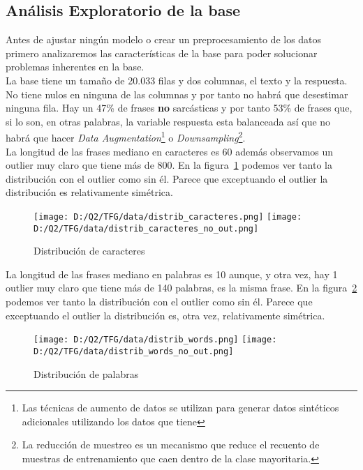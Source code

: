 \documentclass[10pt,riqno,a4paper,twoside]{article}\usepackage[]{graphicx}\usepackage[]{color}
\begin{document}
\subsection{Análisis Exploratorio de la base}

Antes de ajustar ningún modelo o crear un preprocesamiento de los datos primero analizaremos las características de la base para poder solucionar problemas inherentes en la base. \\

La base tiene un tamaño de 20.033 filas y dos columnas, el texto y la respuesta. No tiene nulos en ninguna de las columnas y por tanto no habrá que desestimar ninguna fila. Hay un 47\% de frases \textbf{no} sarcásticas y por tanto 53\% de frases que, si lo son, en otras palabras, la variable respuesta esta balanceada así que no habrá que hacer \textit{Data Augmentation}\footnote{Las técnicas de aumento de datos se utilizan para generar datos sintéticos adicionales utilizando los datos que tiene} o \textit{Downsampling}\footnote{La reducción de muestreo es un mecanismo que reduce el recuento de muestras de entrenamiento que caen dentro de la clase mayoritaria.}. \\

La longitud de las frases mediano en caracteres es 60 además observamos un outlier muy claro que tiene más de 800. En la figura~\ref{fig:Distribucion_ch} podemos ver tanto la distribución con el outlier como sin él. Parece que exceptuando el outlier la distribución es relativamente simétrica. 


\begin{figure}[h]
\caption{Distribución de caracteres}
\begin{center}
\texttt{[image: D:/Q2/TFG/data/distrib\_caracteres.png]}
\texttt{[image: D:/Q2/TFG/data/distrib\_caracteres\_no\_out.png]}
\label{fig:Distribucion_ch}
\end{center}
\end{figure}


La longitud de las frases mediano en palabras es 10 aunque, y otra vez, hay 1 outlier muy claro que tiene más de 140 palabras, es la misma frase. En la figura~\ref{fig:Distribucion_w} podemos ver tanto la distribución con el outlier como sin él. Parece que exceptuando el outlier la distribución es, otra vez, relativamente simétrica. 


\begin{figure}[h]
\caption{Distribución de palabras}
\begin{center}
\texttt{[image: D:/Q2/TFG/data/distrib\_words.png]}
\label{fig:Distribucion_w}
\texttt{[image: D:/Q2/TFG/data/distrib\_words\_no\_out.png]}
\end{center}
\end{figure}
\end{document}
